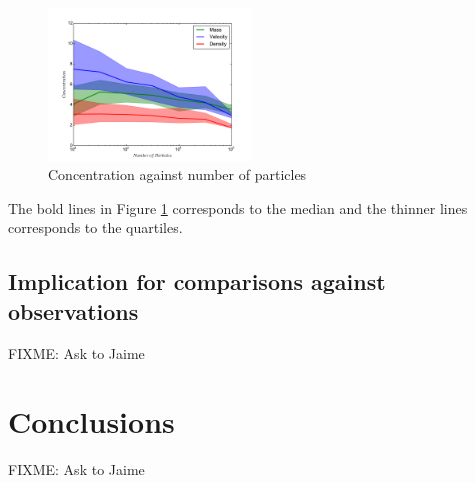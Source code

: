 \documentclass[useAMS,usenatbib]{mn2e}
\begin{document}
\begin{figure}
\begin{center}
  \includegraphics[width=0.48\textwidth]{concentration.pdf}
\end{center}
\caption{Concentration against number of particles
    \label{fig:concentrations}}
\end{figure}

The bold lines in Figure \ref{fig:concentrations} corresponds to the median and the thinner lines corresponds to the quartiles.
\subsection{Implication for comparisons against observations}
FIXME: Ask to Jaime


\section{Conclusions}
\label{sec:conclusions}
FIXME: Ask to Jaime



\end{document}
